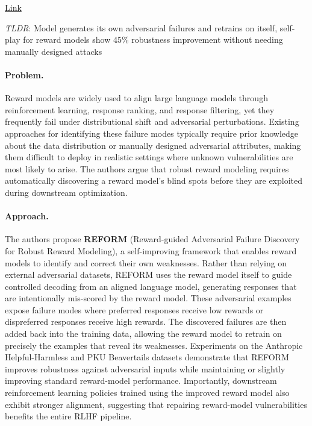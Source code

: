 \documentclass[11pt]{article}
\begin{document}
\href{https://arxiv.org/abs/2507.06419}{Link}

\emph{TLDR}: Model generates its own adversarial failures and retrains on itself, self-play for reward models show 45\% robustness improvement without needing manually designed attacks

\paragraph{Problem.}
Reward models are widely used to align large language models through reinforcement learning, response ranking, and response filtering, yet they frequently fail under distributional shift and adversarial perturbations. Existing approaches for identifying these failure modes typically require prior knowledge about the data distribution or manually designed adversarial attributes, making them difficult to deploy in realistic settings where unknown vulnerabilities are most likely to arise. The authors argue that robust reward modeling requires automatically discovering a reward model's blind spots before they are exploited during downstream optimization.

\paragraph{Approach.}
The authors propose \textbf{REFORM} (Reward-guided Adversarial Failure Discovery for Robust Reward Modeling), a self-improving framework that enables reward models to identify and correct their own weaknesses. Rather than relying on external adversarial datasets, REFORM uses the reward model itself to guide controlled decoding from an aligned language model, generating responses that are intentionally mis-scored by the reward model. These adversarial examples expose failure modes where preferred responses receive low rewards or dispreferred responses receive high rewards. The discovered failures are then added back into the training data, allowing the reward model to retrain on precisely the examples that reveal its weaknesses. Experiments on the Anthropic Helpful-Harmless and PKU Beavertails datasets demonstrate that REFORM improves robustness against adversarial inputs while maintaining or slightly improving standard reward-model performance. Importantly, downstream reinforcement learning policies trained using the improved reward model also exhibit stronger alignment, suggesting that repairing reward-model vulnerabilities benefits the entire RLHF pipeline.
\end{document}
